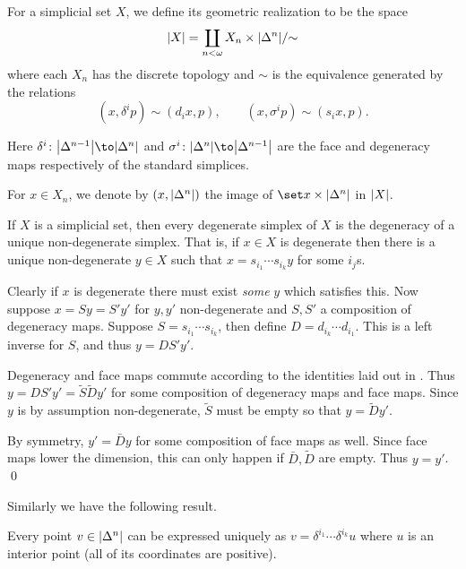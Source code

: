 \bdefn

    For a simplicial set $X$, we define its {\emphcolor geometric realization} to be the space
    $$ \mathopen{}\mathclose{\left|X\right|} = \coprod_{n<\omega}X_n\times\mathopen{}\mathclose{\left|\Delta^n\right|}/{\sim} $$
    where each $X_n$ has the discrete topology and $\sim$ is the equivalence generated by the relations
    $$ (x,\delta^ip) \sim (d_ix,p),\qquad (x,\sigma^ip) \sim (s_ix,p) . $$

    Here $\delta^i\colon\abs{\Delta^{n-1}}\to\abs{\Delta^n}$ and $\sigma^i\colon\abs{\Delta^n}\to\abs{\Delta^{n-1}}$ are the face and degeneracy maps respectively
    of the standard simplices.

\edefn

For $x\in X_n$, we denote by $(x,\mathopen{}\mathclose{\left|\Delta^n\right|})$ the image of $\set x\times\abs{\Delta^n}$ in $\mathopen{}\mathclose{\left|X\right|}$.

\blemm

    If $X$ is a simplicial set, then every degenerate simplex of $X$ is the degeneracy of a unique non-degenerate simplex.
    That is, if $x\in X$ is degenerate then there is a unique non-degenerate $y\in X$ such that $x=s_{i_1}\cdots s_{i_k}y$ for some $i_j$s.

\elemm

\bproof

    Clearly if $x$ is degenerate there must exist {\it some\/} $y$ which satisfies this.
    Now suppose $x=Sy=S'y'$ for $y,y'$ non-degenerate and $S,S'$ a composition of degeneracy maps.
    Suppose $S=s_{i_1}\cdots s_{i_k}$, then define $D=d_{i_k}\cdots d_{i_1}$.
    This is a left inverse for $S$, and thus $y=DS'y'$.

    Degeneracy and face maps commute according to the identities laid out in .
    Thus $y=DS'y'=\tilde S\tilde Dy'$ for some composition of degeneracy maps and face maps.
    Since $y$ is by assumption non-degenerate, $\tilde S$ must be empty so that $y=\tilde Dy'$.

    By symmetry, $y'=\bar Dy$ for some composition of face maps as well.
    Since face maps lower the dimension, this can only happen if $\bar D,\tilde D$ are empty.
    Thus $y=y'$.
    \qed

\eproof

Similarly we have the following result.

\blemm

    Every point $v\in\mathopen{}\mathclose{\left|\Delta^n\right|}$ can be expressed uniquely as $v=\delta^{i_1}\cdots\delta^{i_k}u$ where $u$ is an interior point (all of its coordinates are positive).

